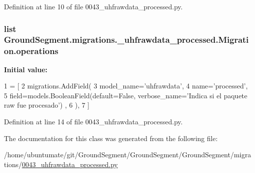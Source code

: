 Definition at line 10 of file 0043\+\_\+uhfrawdata\+\_\+processed.\+py.

\hypertarget{class_ground_segment_1_1migrations_1_10043__uhfrawdata__processed_1_1_migration_ae2e46fcce40f3d61ac187c304782be6a}{}
\subsubsection[{operations}]{\setlength{\rightskip}{0pt plus 5cm}list Ground\+Segment.\+migrations.\+\_\+uhfrawdata\+\_\+processed.\+Migration.\+operations\hspace{0.3cm}{\ttfamily [static]}}\label{class_ground_segment_1_1migrations_1_10043__uhfrawdata__processed_1_1_migration_ae2e46fcce40f3d61ac187c304782be6a}
{\bfseries Initial value\+:}
\begin{DoxyCode}
1 = [
2         migrations.AddField(
3             model\_name=\textcolor{stringliteral}{'uhfrawdata'},
4             name=\textcolor{stringliteral}{'processed'},
5             field=models.BooleanField(default=\textcolor{keyword}{False}, verbose\_name=\textcolor{stringliteral}{'Indica si el paquete raw fue procesado'})
      ,
6         ),
7     ]
\end{DoxyCode}


Definition at line 14 of file 0043\+\_\+uhfrawdata\+\_\+processed.\+py.



The documentation for this class was generated from the following file\+:\begin{DoxyCompactItemize}
\item 
/home/ubuntumate/git/\+Ground\+Segment/\+Ground\+Segment/\+Ground\+Segment/migrations/\hyperlink{0043__uhfrawdata__processed_8py}{0043\+\_\+uhfrawdata\+\_\+processed.\+py}\end{DoxyCompactItemize}
